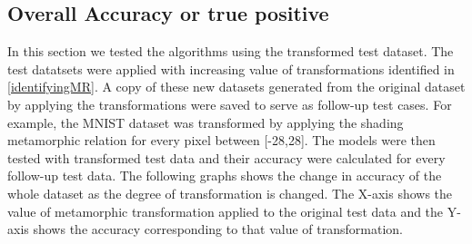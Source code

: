 \subsection{Overall Accuracy or true positive}\label{4.1.1}
In this section we tested the algorithms using the transformed test dataset. The test datatsets were applied with increasing value of transformations identified in \ref{identifyingMR}. A copy of these new datasets generated from the original dataset by applying the transformations were saved to serve as follow-up test cases. For example, the MNIST dataset was transformed by applying the shading metamorphic relation for every pixel between [-28,28]. The models were then tested with transformed test data and their accuracy were calculated for every follow-up test data. The following graphs shows the change in accuracy of the whole dataset as the degree of transformation is changed. The X-axis shows the value of metamorphic transformation applied to the original test data and the Y-axis shows the accuracy corresponding to that value of transformation.
